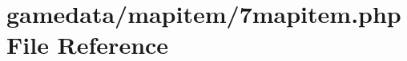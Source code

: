 \hypertarget{7mapitem_8php}{\section{gamedata/mapitem/7mapitem.php File Reference}
\label{7mapitem_8php}
}
